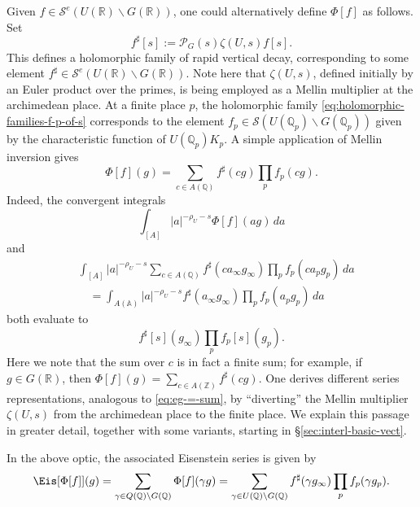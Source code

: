 \begin{remark}\label{rmk:one-could-altern}
  Given $f \in \mathcal{S}^e(U(\mathbb{R}) \backslash G(\mathbb{R}))$, one could alternatively define $\Phi[f]$ as follows.  Set
  \begin{equation*}
    f^\sharp [s] := \mathcal{P}_G(s) \zeta(U,s) f[s].
  \end{equation*}
  This defines a holomorphic family of rapid vertical decay, corresponding to some element $f^\sharp \in \mathcal{S}^e(U(\mathbb{R}) \backslash G(\mathbb{R}))$.  Note here that $\zeta(U,s)$, defined initially by an Euler product over the primes, is being employed as a Mellin multiplier at the archimedean place.  At a finite place $p$, the holomorphic family \eqref{eq:holomorphic-families-f-p-of-s} corresponds to the element $f_p \in \mathcal{S}(U(\mathbb{Q}_p) \backslash G(\mathbb{Q}_p))$ given by the characteristic function of $U(\mathbb{Q}_p) K_p$.  A simple application of Mellin inversion gives
  \begin{equation*}
    \Phi[f](g) = \sum_{c \in A(\mathbb{Q})} f^\sharp (c g) \prod_p f_p(c g).
  \end{equation*}
  Indeed, the convergent integrals
  \begin{equation*}
    \int_{[A]} |a|^{-\rho_U - s}\Phi[f](a g)  \, d a
  \end{equation*}
  and
  \begin{align*}
    &\int_{[A]} |a|^{-\rho_U - s}\sum_{c \in A(\mathbb{Q})} f^\sharp (c a_\infty  g_\infty ) \prod_p f_p (c a_p g_p) \, d a \\
    &\quad =
      \int_{A(\mathbb{A}) } |a|^{-\rho_U - s} f^\sharp (a_\infty  g_\infty ) \prod_p f_p (a_p g_p) \, d a
  \end{align*}
  both evaluate to
  \begin{equation*}
    f^\sharp [s] (g_\infty ) \prod_p f_p [s] (g_p).
  \end{equation*}
  Here we note that the sum over $c$ is in fact a finite sum; for example, if $g \in G(\mathbb{R})$, then $\Phi[f](g) = \sum_{c \in A(\mathbb{Z})} f^\sharp (c g)$.  One derives different series representations, analogous to \eqref{eq:eg-=-sum}, by ``diverting'' the Mellin multiplier $\zeta(U,s)$ from the archimedean place to the finite place.  We explain this passage in greater detail, together with some variants, starting in \S\ref{sec:interl-basic-vect}.

  In the above optic, the associated Eisenstein series is given by
  \begin{equation}\label{eq:eisphif=-sum-_gamma}
    \Eis[\Phi[f]](g) = \sum_{\gamma \in Q(\mathbb{Q}) \backslash G(\mathbb{Q}) } \Phi[f](\gamma g)
    = \sum_{\gamma \in U(\mathbb{Q}) \backslash G(\mathbb{Q})} f^\sharp (\gamma g_\infty ) \prod_p f_p (\gamma g_p).
  \end{equation}
\end{remark}
